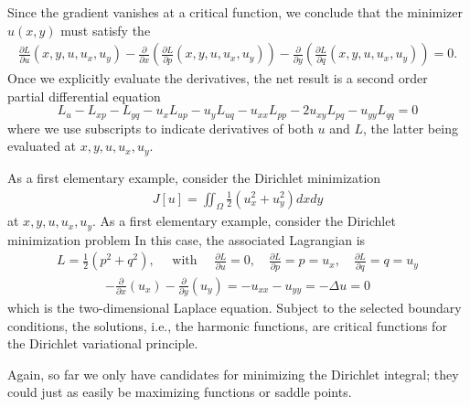 \documentclass{article}
\begin{document}
Since the gradient vanishes at a critical function, we conclude that the minimizer $u(x, y)$ must satisfy the  
\begin{align}
    \frac{\partial L}{\partial u}\left(x, y, u, u_{x}, u_{y}\right)-\frac{\partial}{\partial x}\left(\frac{\partial L}{\partial p}\left(x, y, u, u_{x}, u_{y}\right)\right)-\frac{\partial}{\partial y}\left(\frac{\partial L}{\partial q}\left(x, y, u, u_{x}, u_{y}\right)\right)=0 .
\end{align}
Once we explicitly evaluate the derivatives, the net result is a second order partial differential equation
$$L_{u}-L_{x p}-L_{y q}-u_{x} L_{u p}-u_{y} L_{u q}-u_{x x} L_{p p}-2 u_{x y} L_{p q}-u_{y y} L_{q q}=0$$ where we use subscripts to indicate derivatives of both $u$ and $L$, the latter being evaluated at $x, y, u, u_{x}, u_{y} .$ 
\begin{exma}
As a first elementary example, consider the Dirichlet minimization \begin{align*} J[u]=\iint_{\Omega} \frac{1}{2}\left(u_{x}^{2}+u_{y}^{2}\right) d x d y \end{align*} at $x, y, u, u_{x}, u_{y}$.
As a first elementary example, consider the Dirichlet minimization problem
In this case, the associated Lagrangian is \begin{align*} L=\frac{1}{2}\left(p^{2}+q^{2}\right), \quad \text { with } \quad \frac{\partial L}{\partial u}=0, \quad \frac{\partial L}{\partial p}=p=u_{x}, \quad \frac{\partial L}{\partial q}=q=u_{y} \end{align*}
\begin{align*}
-\frac{\partial}{\partial x}\left(u_{x}\right)-\frac{\partial}{\partial y}\left(u_{y}\right)=-u_{x x}-u_{y y}=-\Delta u=0
\end{align*}
which is the two-dimensional Laplace equation. Subject to the selected boundary conditions, the solutions, i.e., the harmonic functions, are critical functions for the Dirichlet variational principle.
\end{exma} 
\begin{rema}
Again,  so far we only have candidates for minimizing the Dirichlet integral; they could just as easily be maximizing functions or saddle points.
\end{rema}
\end{document}
